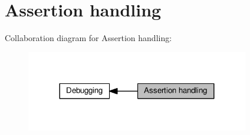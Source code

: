 \hypertarget{group__lwip__assertions}{}\section{Assertion handling}
\label{group__lwip__assertions}
Collaboration diagram for Assertion handling\+:
\nopagebreak
\begin{figure}[H]
\begin{center}
\leavevmode
\includegraphics[width=276pt]{group__lwip__assertions}
\end{center}
\end{figure}
